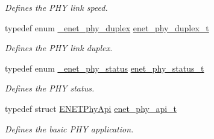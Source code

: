 \begin{DoxyCompactItemize}
\begin{DoxyCompactList}\small\item\em Defines the P\+HY link speed. \end{DoxyCompactList}\item 
typedef enum \hyperlink{group__phy__driver_ga25ad8ca957c7a3088e2d40fbe61decd9}{\+\_\+enet\+\_\+phy\+\_\+duplex} \hyperlink{group__phy__driver_ga0c6955577513a799936696749860cf0b}{enet\+\_\+phy\+\_\+duplex\+\_\+t}\hypertarget{group__phy__driver_ga0c6955577513a799936696749860cf0b}{}\label{group__phy__driver_ga0c6955577513a799936696749860cf0b}

\begin{DoxyCompactList}\small\item\em Defines the P\+HY link duplex. \end{DoxyCompactList}\item 
typedef enum \hyperlink{group__phy__driver_ga36e35ce36b105de1638ac99724204790}{\+\_\+enet\+\_\+phy\+\_\+status} \hyperlink{group__phy__driver_gad99f33b24e4edb7c736097bf061122dd}{enet\+\_\+phy\+\_\+status\+\_\+t}\hypertarget{group__phy__driver_gad99f33b24e4edb7c736097bf061122dd}{}\label{group__phy__driver_gad99f33b24e4edb7c736097bf061122dd}

\begin{DoxyCompactList}\small\item\em Defines the P\+HY status. \end{DoxyCompactList}\item 
typedef struct \hyperlink{structENETPhyApi}{E\+N\+E\+T\+Phy\+Api} \hyperlink{group__phy__driver_ga2ff12f57e0a9d4cec3036656a2895581}{enet\+\_\+phy\+\_\+api\+\_\+t}\hypertarget{group__phy__driver_ga2ff12f57e0a9d4cec3036656a2895581}{}\label{group__phy__driver_ga2ff12f57e0a9d4cec3036656a2895581}

\begin{DoxyCompactList}\small\item\em Defines the basic P\+HY application. \end{DoxyCompactList}\end{DoxyCompactItemize}
